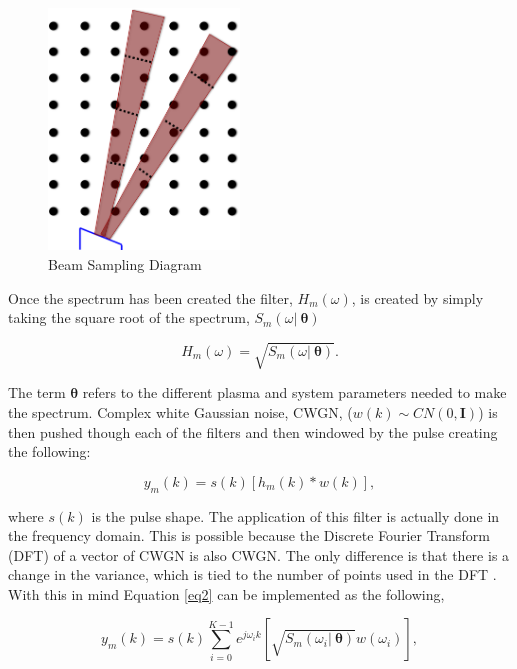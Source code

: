 \documentclass[draft,ras]{agutex}
\begin{document}
\begin{article}
\begin{figure}[!t]
\centering
\includegraphics[width=2in]{beamsampling}
\caption{Beam Sampling Diagram}
\label{fig:beamdia}
\end{figure}

Once the spectrum has been created the filter, $H_m(\omega)$, is created by simply taking the square root of the spectrum, $S_m(\omega | \: \bm{\theta})$

\begin{equation}
\label{eq1}
H_m(\omega) = \sqrt{S_m(\omega | \: \bm{\theta})}.
\end{equation}

\noindent The term $ \bm{\theta}$ refers to the different plasma and system parameters needed to make the spectrum. Complex white Gaussian noise, CWGN, ($w(k)\sim CN(0,\mathbf{I})$) is then pushed though each of the filters and then windowed by the pulse creating the following:   

\begin{equation}
\label{eq2}
y_m (k)= s(k)\left[h_m(k)*w(k)\right],
\end{equation}
 
\noindent where $s(k)$ is the pulse shape. The application of this filter is actually done in the frequency domain. This is possible because the Discrete Fourier Transform (DFT) of a vector of CWGN is also CWGN. The only difference is that there is a change in the variance, which is tied to the number of points used in the DFT \citep{kayvol1}. With this in mind Equation \ref{eq2} can be implemented as the following,

\begin{equation}
\label{eq:fftfilt}
y_m (k)= s(k)\displaystyle \sum_{i=0}^{K-1}e^{j\omega_ik}\left[ \sqrt{S_m(\omega_i | \: \bm{\theta})}w(\omega_i)\right],
\end{equation}


\end{article}
\end{document}
